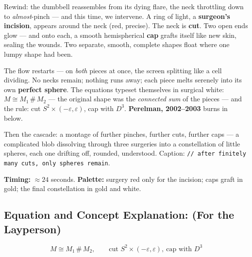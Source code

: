 \documentclass[11pt]{article}
\begin{document}
Rewind: the dumbbell reassembles from its dying flare, the neck throttling down to
\emph{almost}-pinch --- and this time, we intervene. A ring of light, a
\textbf{surgeon's incision}, appears around the neck (red, precise). The neck is
\textbf{cut}. Two open ends glow --- and onto each, a smooth hemispherical
\textbf{cap} grafts itself like new skin, sealing the wounds. Two separate,
smooth, complete shapes float where one lumpy shape had been.

The flow restarts --- on \emph{both} pieces at once, the screen splitting like a
cell dividing. No necks remain; nothing runs away; each piece melts serenely into
its own \textbf{perfect sphere}. The equations typeset themselves in surgical white:
\( M \cong M_1 \,\#\, M_2 \) --- the original shape was the \emph{connected sum} of
the pieces --- and the rule: cut $S^2\times(-\varepsilon,\varepsilon)$, cap with $D^3$.
\textbf{Perelman, 2002--2003} burns in below.

Then the cascade: a montage of further pinches, further cuts, further caps ---
a complicated blob dissolving through three surgeries into a constellation of little
spheres, each one drifting off, rounded, understood. Caption:
\texttt{// after finitely many cuts, only spheres remain}.

\textbf{Timing:} $\approx 24$ seconds. \textbf{Palette:} surgery red only for the
incision; caps graft in gold; the final constellation in gold and white.

\subsection*{Equation and Concept Explanation: (For the Layperson)}

\[
M \cong M_1 \,\#\, M_2, \qquad \text{cut } S^2\times(-\varepsilon,\varepsilon),\ \text{cap with } D^3
\]
\end{document}
